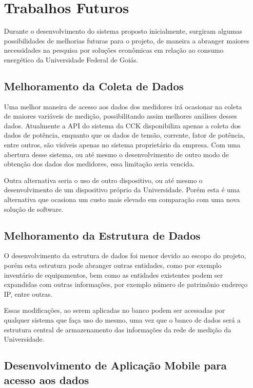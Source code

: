 \chapter{Trabalhos Futuros}
\label{c:trabalhos_futuros}

Durante o desenvolvimento do sistema proposto inicialmente, surgiram algumas possibilidades de melhorias futuras para o projeto, de maneira a abranger maiores necessidades na pesquisa por soluções econômicas em relação ao consumo energético da Universidade Federal de Goiás.

\section{Melhoramento da Coleta de Dados}

Uma melhor maneira de acesso aos dados dos medidores irá ocasionar na coleta de maiores variáveis de medição, possibilitando assim melhores análises desses dados. Atualmente a API do sistema da CCK disponibiliza apenas a coleta dos dados de potência, enquanto que os dados de tensão, corrente, fator de potência, entre outros, são visíveis apenas no sistema proprietário da empresa. Com uma abertura desse sistema, ou até mesmo o desenvolvimento de outro modo de obtenção dos dados dos medidores, essa limitação seria vencida.

Outra alternativa seria o uso de outro dispositivo, ou até mesmo o desenvolvimento de um dispositivo próprio da Universidade. Porém esta é uma alternativa que ocasiona um custo mais elevado em comparação com uma nova solução de software.

\section{Melhoramento da Estrutura de Dados}

O desenvolvimento da estrutura de dados foi menor devido ao escopo do projeto, porém esta estrutura pode abranger outras entidades, como por exemplo inventário de equipamentos, bem como as entidades existentes podem ser expandidas com outras informações, por exemplo número de patrimônio endereço IP, entre outras.

Essas modificações, ao serem aplicadas no banco podem ser acessadas por qualquer sistema que faça uso do mesmo, uma vez que o banco de dados será a estrutura central de armazenamento das informações da rede de medição da Universidade. 

\newpage

\section{Desenvolvimento de Aplicação Mobile para acesso aos dados}

